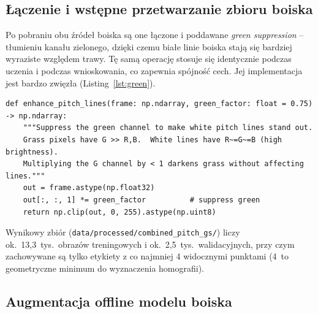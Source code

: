 \documentclass[11pt,a4paper]{article}
\begin{document}
\subsection{Łączenie i wstępne przetwarzanie zbioru boiska}

Po pobraniu obu źródeł boiska są one łączone i poddawane \emph{green
suppression} -- tłumieniu kanału zielonego, dzięki czemu białe linie boiska
stają się bardziej wyraziste względem trawy. Tę samą operację stosuje się
identycznie podczas uczenia i podczas wnioskowania, co zapewnia spójność cech.
Jej implementacja jest bardzo zwięzła (Listing~\ref{lst:green}).

\begin{lstlisting}[style=py,caption={Tłumienie kanału zielonego -- \texttt{src/football\_tracker/pitch/preprocess.py}},label={lst:green}]
def enhance_pitch_lines(frame: np.ndarray, green_factor: float = 0.75) -> np.ndarray:
    """Suppress the green channel to make white pitch lines stand out.
    Grass pixels have G >> R,B.  White lines have R~=G~=B (high brightness).
    Multiplying the G channel by < 1 darkens grass without affecting lines."""
    out = frame.astype(np.float32)
    out[:, :, 1] *= green_factor          # suppress green
    return np.clip(out, 0, 255).astype(np.uint8)
\end{lstlisting}

Wynikowy zbiór (\texttt{data/processed/combined\_pitch\_gs/}) liczy 
 ok.~13,3~tys.\ obrazów treningowych i ok.~2,5~tys.\ walidacyjnych,
przy czym zachowywane są tylko etykiety z co najmniej 4 widocznymi punktami
(4~to geometryczne minimum do wyznaczenia homografii).

\subsection{Augmentacja offline modelu boiska}
\end{document}
